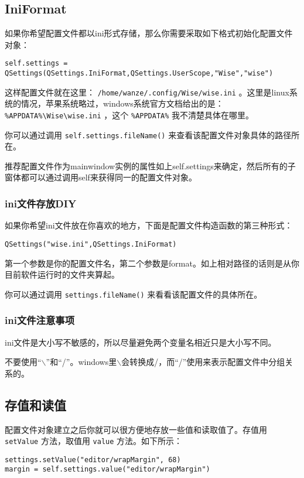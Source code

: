 \documentclass[11pt,oneside]{article}
\begin{document}
\subsection{IniFormat}
\label{sec:orgheadline30}
如果你希望配置文件都以ini形式存储，那么你需要采取如下格式初始化配置文件对象：
\begin{Verbatim}
self.settings = QSettings(QSettings.IniFormat,QSettings.UserScope,"Wise","wise")
\end{Verbatim}

这样配置文件就在这里： \texttt{/home/wanze/.config/Wise/wise.ini} 。这里是linux系统的情况，苹果系统略过，windows系统官方文档给出的是： \texttt{\%APPDATA\%\textbackslash{}Wise\textbackslash{}wise.ini} ，这个 \texttt{\%APPDATA\%} 我不清楚具体在哪里。

你可以通过调用 \texttt{self.settings.fileName()} 来查看该配置文件对象具体的路径所在。

推荐配置文件作为mainwindow实例的属性如上self.settings来确定，然后所有的子窗体都可以通过调用self来获得同一的配置文件对象。

\subsubsection{ini文件存放DIY}
\label{sec:orgheadline28}
如果你希望ini文件放在你喜欢的地方，下面是配置文件构造函数的第三种形式：
\begin{Verbatim}
QSettings("wise.ini",QSettings.IniFormat)
\end{Verbatim}

第一个参数是你的配置文件名，第二个参数是format。如上相对路径的话则是从你目前软件运行时的文件夹算起。

你可以通过调用 \texttt{settings.fileName()} 来看看该配置文件的具体所在。

\subsubsection{ini文件注意事项}
\label{sec:orgheadline29}
ini文件是大小写不敏感的，所以尽量避免两个变量名相近只是大小写不同。

不要使用“$\backslash$”和“/”。windows里$\backslash$会转换成/，而“/”使用来表示配置文件中分组关系的。


\subsection{存值和读值}
\label{sec:orgheadline31}
配置文件对象建立之后你就可以很方便地存放一些值和读取值了。存值用 \texttt{setValue} 方法，取值用 \texttt{value} 方法。如下所示：
\begin{Verbatim}
settings.setValue("editor/wrapMargin", 68)
margin = self.settings.value("editor/wrapMargin")
\end{Verbatim}
\end{document}
